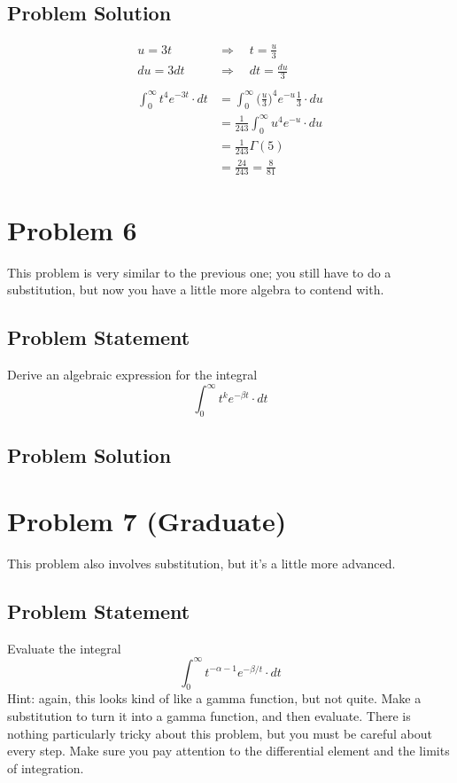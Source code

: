 \documentclass[12pt]{article}
\theoremstyle{definition}
\begin{document}
\subsection*{Problem Solution}
\begin{align*}
u = 3t \quad&\Rightarrow\quad t = \frac{u}{3}\\
du = 3dt \quad&\Rightarrow\quad dt = \frac{du}{3}\\\\
\int_0^\infty t^4 e^{-3t} \cdot dt &= \int_0^\infty \biggr(\frac{u}{3}\biggr)^4 e^{-u} \frac{1}{3}\cdot du\\
&= \frac{1}{243}\int_0^\infty u^4 e^{-u}\cdot du\\
&= \frac{1}{243} \Gamma(5)\\
& = \frac{24}{243} = \frac{8}{81}
\end{align*}




\newpage
\section*{Problem 6}

This problem is very similar to the previous one; you still have to do a substitution, but now you have a little more algebra to contend with.

\subsection*{Problem Statement}

Derive an algebraic expression for the integral
$$
\int_0^\infty t^k e^{-\beta t} \cdot dt
$$

\subsection*{Problem Solution}



\newpage
\section*{Problem 7 (Graduate)}

This problem also involves substitution, but it's a little more advanced.

\subsection*{Problem Statement}

Evaluate the integral
$$
\int_0^\infty t^{-\alpha- 1} e^{-\beta/t} \cdot dt
$$
Hint: again, this looks kind of like a gamma function, but not quite. Make a substitution to turn it into a gamma function, and then evaluate. There is nothing particularly tricky about this problem, but you must be careful about every step. Make sure you pay attention to the differential element and the limits of integration.
\end{document}
